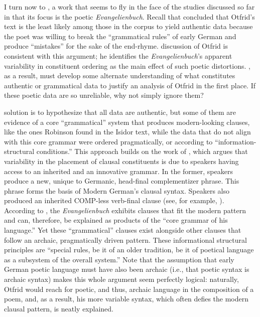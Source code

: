 I turn now to \citet{Lötscher2009}, a work that seems to fly in the face of the studies discussed so far in that its focus is the poetic \textit{Evangelienbuch}. Recall that \citet{Fleischer2006} concluded that Otfrid’s text is the least likely among those in the corpus to yield authentic data because the poet was willing to break the “grammatical rules” of early German and produce “mistakes” for the sake of the end-rhyme.  discussion of Otfrid is consistent with this argument; he identifies the \textit{Evangelienbuch}’s apparent variability in constituent ordering as the main effect of such poetic distortions. \citet{Lötscher2009}, as a result, must develop some alternate understanding of what constitutes authentic or grammatical data to justify an analysis of Otfrid in the first place. If these poetic data are so unreliable, why not simply ignore them?

 solution is to hypothesize that all data are authentic, but some of them are evidence of a core “grammatical” system that produces modern-looking clauses, like the ones Robinson found in the Isidor text, while the data that do not align with this core grammar were ordered pragmatically, or according to “information-structural conditions.” This approach builds on the work of \citet{Lenerz1984, Lenerz1985}, which argues that variability in the placement of clausal constituents is due to speakers having access to an inherited and an innovative grammar. In the former, speakers produce a new, unique to Germanic, head-final complementizer phrase. This phrase forms the basis of Modern German’s clausal syntax. Speakers also produced an inherited COMP-less verb-final clause (see, for example, \citealt[117--119]{Lenerz1985}). According to \citet[182]{Lötscher2009}, the \textit{Evangelienbuch} exhibits clauses that fit the modern pattern and can, therefore, be explained as products of the “core grammar of his language.” Yet these “grammatical” clauses exist alongside other clauses that follow an archaic, pragmatically driven pattern. These informational structural principles are “special rules, be it of an older tradition, be it of poetical language as a subsystem of the overall system.” Note that the assumption that early German poetic language must have also been archaic (i.e., that poetic syntax is archaic syntax) makes this whole argument seem perfectly logical: naturally, Otfrid would reach for poetic, and thus, archaic language in the composition of a poem, and, as a result, his more variable syntax, which often defies the modern clausal pattern, is neatly explained.

